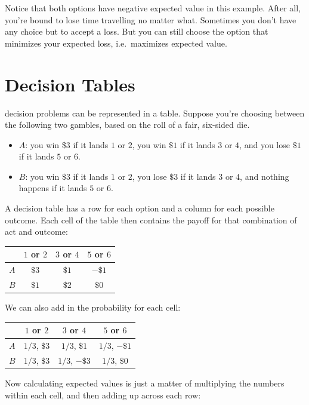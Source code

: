 \documentclass[justified]{tufte-book}
\providecommand{\tightlist}{%
  \setlength{\itemsep}{0pt}\setlength{\parskip}{0pt}}
\theoremstyle{definition}
\theoremstyle{definition}
\theoremstyle{definition}
\theoremstyle{remark}
\begin{document}
Notice that both options have negative expected value in this example.
After all, you're bound to lose time travelling no matter what.
Sometimes you don't have any choice but to accept a loss. But you can
still choose the option that minimizes your expected loss,
i.e.~maximizes expected value.

\hypertarget{decision-tables}{%
\section{Decision Tables}\label{decision-tables}}

 decision problems can be represented in a table.
Suppose you're choosing between the following two gambles, based on the
roll of a fair, six-sided die.

\begin{itemize}
\tightlist
\item
  \(A\): you win \$3 if it lands \(1\) or \(2\), you win \(\$1\) if it
  lands \(3\) or \(4\), and you lose \(\$1\) if it lands \(5\) or \(6\).
\item
  \(B\): you win \(\$3\) if it lands \(1\) or \(2\), you lose \(\$3\) if
  it lands \(3\) or \(4\), and nothing happens if it lands \(5\) or
  \(6\).
\end{itemize}

A decision table has a row for each option and a column for each
possible outcome. Each cell of the table then contains the payoff for
that combination of act and outcome:

\begin{longtable}[]{@{}lccc@{}}
\toprule
& \(1\) or \(2\) & \(3\) or \(4\) & \(5\) or \(6\)\tabularnewline
\midrule
\endhead
\(A\) & \(\$3\) & \(\$1\) & \(-\$1\)\tabularnewline
\(B\) & \(\$1\) & \(\$2\) & \(\$0\)\tabularnewline
\bottomrule
\end{longtable}

We can also add in the probability for each cell:

\begin{longtable}[]{@{}lccc@{}}
\toprule
& \(1\) or \(2\) & \(3\) or \(4\) & \(5\) or \(6\)\tabularnewline
\midrule
\endhead
\(A\) & \(1/3\), \(\$3\) & \(1/3\), \(\$1\) & \(1/3\),
\(-\$1\)\tabularnewline
\(B\) & \(1/3\), \(\$3\) & \(1/3\), \(-\$3\) & \(1/3\),
\(\$0\)\tabularnewline
\bottomrule
\end{longtable}

Now calculating expected values is just a matter of multiplying the
numbers within each cell, and then adding up across each row:
\end{document}
